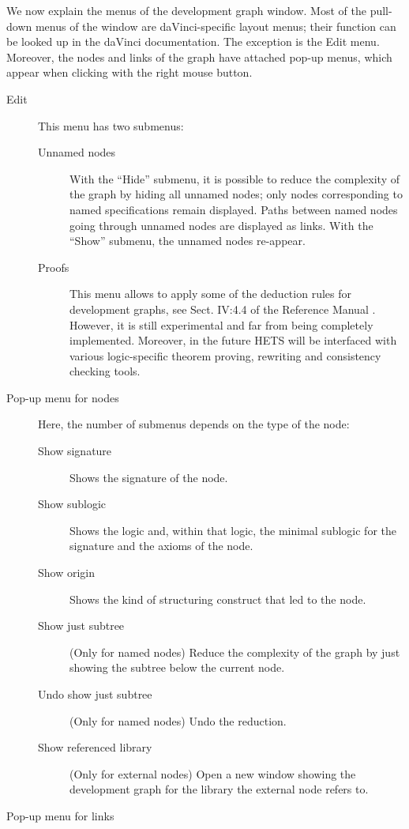 \documentclass{article}
\newcommand{\normalTEXTSC}[2]{{#1\scriptsize#2}}
\newcommand     {\Hets}{\normalTEXTSC{H}{ETS}\xspace}
\begin{document}
We now explain the menus of the development graph window.
Most of the pull-down menus of the window are daVinci-specific
layout menus;
their function can be looked up in the daVinci documentation.
The exception is the Edit menu. Moreover, the nodes and links
of the graph have attached pop-up menus, which appear when
clicking with the right mouse button.
 
\begin{description}
\item[Edit] This menu has two submenus:
\begin{description}
\item[Unnamed nodes] With the ``Hide'' submenu, it is possible
to reduce the complexity of the graph by hiding all unnamed nodes;
only nodes corresponding to named specifications remain displayed.
Paths between named nodes going through unnamed nodes
are displayed as links. With the ``Show'' submenu, the unnamed
nodes re-appear.
\item[Proofs] This menu allows to apply some of the deduction
rules for development graphs, see Sect. IV:4.4 of the \CASL 
Reference Manual \cite{CASL/RefManual}. However, it is still
experimental and far from being completely implemented.
Moreover, in the future \Hets will be interfaced with various
 logic-specific theorem proving, rewriting and consistency checking
 tools.  
\end{description}
\item[Pop-up menu for nodes]
Here, the number of submenus depends on the type of the node:
\begin{description}
\item[Show signature] Shows the signature of the node.
\item[Show sublogic] Shows the logic and, within that logic, the minimal sublogic
for the signature and the axioms of the node.
\item[Show origin] Shows the kind of \CASL structuring construct that
led to the node.
\item[Show just subtree] (Only for named nodes) Reduce the complexity
of the graph by just showing the subtree below the current node.
\item[Undo show just subtree] (Only for named nodes) Undo the reduction.
\item[Show referenced library] (Only for external nodes) Open a new window
showing the development graph for the library the external node refers to.
\end{description}
\item[Pop-up menu for links]

\end{description}
\end{document}
